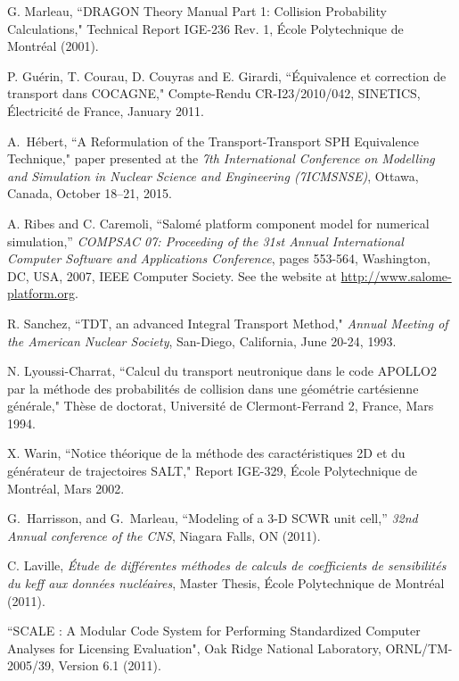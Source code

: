 \begin{thebibliography}{99}
G. Marleau, ``DRAGON Theory Manual Part 1: Collision Probability Calculations," Technical Report IGE-236 
Rev. 1, \'Ecole Polytechnique de Montr\'eal (2001).

P. Gu\'erin, T. Courau, D. Couyras and E. Girardi, ``\'Equivalence et correction de transport dans COCAGNE," Compte-Rendu CR-I23/2010/042, SINETICS, \'Electricit\'e de France, January 2011.

A.~H\'ebert, ``A Reformulation of the Transport-Transport SPH Equivalence Technique," paper presented at the
\textsl{7th International Conference on Modelling and Simulation in Nuclear Science and Engineering (7ICMSNSE)}, Ottawa, Canada, October 18--21, 2015.

A. Ribes and C. Caremoli, ``Salom\'e platform component model for numerical simulation,'' {\sl COMPSAC 07: Proceeding of the 31st Annual International Computer Software and Applications Conference}, pages 553-564, Washington, DC, USA, 2007, IEEE Computer Society.
See the website at \url{http://www.salome-platform.org}.

R. Sanchez, ``TDT, an advanced Integral Transport Method," {\sl Annual Meeting of the American Nuclear Society}, San-Diego, California, June 20-24, 1993.

N. Lyoussi-Charrat, ``Calcul du transport neutronique dans le code APOLLO2 par la m\'ethode des probabilit\'es de
collision dans une g\'eom\'etrie cart\'esienne g\'en\'erale," Th\`ese de doctorat, Universit\'e de Clermont-Ferrand 2, France,
Mars 1994.

X. Warin, ``Notice th\'eorique de la m\'ethode des caract\'eristiques 2D et du g\'en\'erateur de trajectoires SALT," Report IGE-329, \'Ecole Polytechnique de Montr\'eal, Mars 2002.

 G.~Harrisson, and G.~Marleau, ``Modeling of a {3-D} {SCWR} unit cell,''
  {\sl 32nd Annual conference of the CNS}, Niagara Falls, ON (2011).

C. Laville, {\sl \'Etude de diff\'erentes m\'ethodes de calculs de coefficients de
sensibilit\'es du keff aux donn\'ees nucl\'eaires}, Master Thesis, \'Ecole Polytechnique de Montr\'eal (2011).

``SCALE : A Modular Code System for Performing Standardized Computer Analyses for Licensing Evaluation",
Oak Ridge National Laboratory, ORNL/TM-2005/39, Version 6.1 (2011).


\end{thebibliography}
